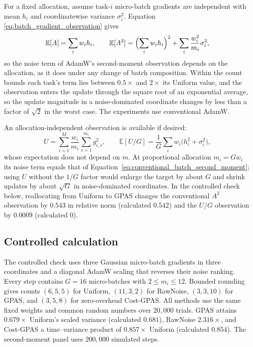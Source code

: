 For a fixed allocation, assume task-$i$ micro-batch gradients are independent
with mean $h_i$ and coordinatewise variance $\sigma_i^2$. Equation
\ref{eq:batch_gradient_observation} gives
\begin{equation}
    \mathbb E[A]=\sum_iw_i h_i,
    \qquad
    \mathbb E[A^2]=\Bigl(\sum_iw_i h_i\Bigr)^2
    +\sum_i\frac{w_i^2}{m_i}\sigma_i^2,
    \label{eq:conventional_batch_second_moment}
\end{equation}
so the noise term of AdamW's second-moment observation depends on the
allocation, as it does under any change of batch composition. Within the
count bounds each task's term lies between $0.5\times$ and $2\times$ its
Uniform value, and the observation enters the update through the square root
of an exponential average, so the update magnitude in a noise-dominated
coordinate changes by less than a factor of $\sqrt2$ in the worst case. The
experiments use conventional AdamW.

An allocation-independent observation is available if desired:
\begin{equation}
    U=\sum_{i=1}^M\frac{w_i}{m_i}\sum_{s=1}^{m_i}g_{i,s}^2,
    \qquad
    \mathbb E[U/G]=\frac1G\sum_iw_i\bigl(h_i^2+\sigma_i^2\bigr),
    \label{eq:taskwise_square_observation}
\end{equation}
whose expectation does not depend on $m$. At proportional allocation
$m_i=Gw_i$ its noise term equals that of
Equation~\ref{eq:conventional_batch_second_moment}; using $U$ without the
$1/G$ factor would enlarge the target by about $G$ and shrink updates by about
$\sqrt G$ in noise-dominated coordinates. In the controlled check below,
reallocating from Uniform to GPAS changes the conventional $A^2$ observation
by $0.543$ in relative norm (calculated $0.542$) and the $U/G$ observation by
$0.0009$ (calculated $0$).

\subsection{Controlled calculation}
\label{app:controlled}

The controlled check uses three Gaussian micro-batch gradients in three
coordinates and a diagonal AdamW scaling that reverses their noise ranking.
Every step contains $G=16$ micro-batches with $2\leq m_i\leq12$. Bounded
rounding gives counts $(6,5,5)$ for Uniform, $(11,3,2)$ for RawNoise,
$(3,3,10)$ for GPAS, and $(3,5,8)$ for zero-overhead Cost-GPAS. All methods
use the same fixed weights and common random numbers over $20{,}000$ trials.
GPAS attains $0.679\times$ Uniform's scaled variance (calculated $0.681$),
RawNoise $2.316\times$, and Cost-GPAS a time--variance product of
$0.857\times$ Uniform (calculated $0.854$). The second-moment panel uses
$200{,}000$ simulated steps.

